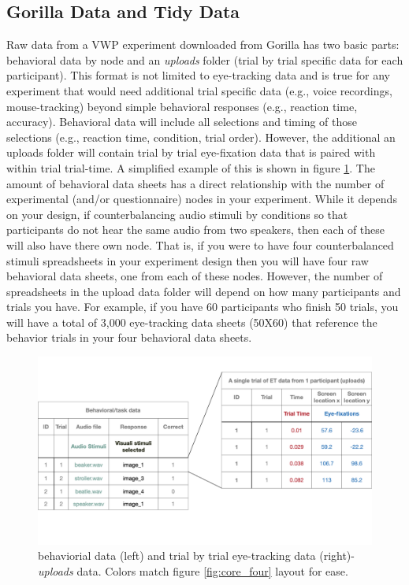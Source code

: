 \subsection{Gorilla Data and Tidy Data}

Raw data from a VWP experiment downloaded from Gorilla has two basic parts: behavioral data by node and an \textit{uploads} folder (trial by trial specific data for each participant). This format is not limited to eye-tracking data and is true for any experiment that would need additional trial specific data (e.g., voice recordings, mouse-tracking) beyond simple behavioral responses (e.g., reaction time, accuracy). Behavioral data will include all selections and timing of those selections (e.g., reaction time, condition, trial order). However, the additional an uploads folder will contain trial by trial eye-fixation data that is paired with within trial trial-time.  A simplified example of this is shown in figure \ref{fig:data_structure}. The amount of behavioral data sheets has a direct relationship with the number of experimental (and/or questionnaire) nodes in your experiment. While it depends on your design, if counterbalancing audio stimuli by conditions so that participants do not hear the same audio from two speakers, then each of these will also have there own node. That is, if you were to have four counterbalanced stimuli spreadsheets in your experiment design then you will have four raw behavioral data sheets, one from each of these nodes. However, the number of spreadsheets in the upload data folder will depend on how many participants and trials you have. For example, if you have 60 participants who finish 50 trials, you will have a total of 3,000 eye-tracking data sheets (50X60) that reference the behavior trials in your four behavioral data sheets.

\begin{figure}[ht]
    \centering
    \includegraphics[scale=.2]{figures/data_structure.png}
    \caption{behaviorial data (left) and trial by trial eye-tracking data (right)-\textit{uploads} data. Colors match figure \ref{fig:core_four} layout for ease.}
    \label{fig:data_structure}
\end{figure}

